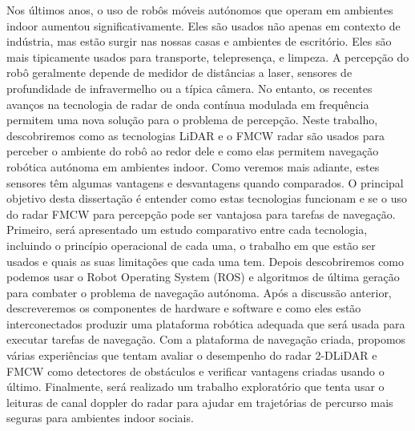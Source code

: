 \TitlePage
  \vspace*{55mm}
       {Nos últimos anos, o uso de robôs móveis autónomos que operam em ambientes indoor aumentou significativamente. Eles são usados não apenas
        em contexto de indústria, mas estão surgir nas nossas casas e ambientes de escritório. Eles são mais tipicamente usados para transporte, telepresença,
        e limpeza. A percepção do robô geralmente depende de medidor de distâncias a laser, sensores de profundidade de infravermelho ou a típica câmera. No entanto, os recentes avanços na tecnologia de radar de onda contínua modulada em frequência permitem uma nova solução para o problema de percepção. Neste trabalho, descobriremos como  as tecnologias \ac{LiDAR} e o \ac{FMCW} \ac{radar} são usados para perceber o ambiente do robô ao redor dele e como elas permitem  navegação robótica autónoma em ambientes indoor. Como veremos mais adiante, estes sensores têm algumas vantagens e desvantagens quando comparados. O principal objetivo desta dissertação é
        entender como estas tecnologias funcionam e se o uso do radar FMCW para
        percepção pode ser vantajosa para tarefas de navegação.
       }
       \TEXT{}
       { Primeiro, será apresentado um estudo comparativo entre cada tecnologia, incluindo o princípio operacional de cada uma, o trabalho em que estão ser usados e quais as suas limitações que cada uma tem. Depois descobriremos como podemos usar o Robot Operating
        System (ROS) e algoritmos de última geração para combater o problema de navegação autónoma. Após a discussão anterior, descreveremos
        os componentes de hardware e software e como eles estão interconectados
        produzir uma plataforma robótica adequada que será usada para executar tarefas de navegação.
        Com a plataforma de navegação criada, propomos várias experiências que
        tentam avaliar o desempenho do radar 2-DLiDAR e FMCW como
        detectores de obstáculos e verificar vantagens criadas usando o
        último. Finalmente, será realizado um trabalho exploratório que tenta usar o
        leituras de canal doppler do radar para ajudar em trajetórias de percurso mais seguras para ambientes indoor sociais}.
       \TEXT{}     
       {%
       }
 
